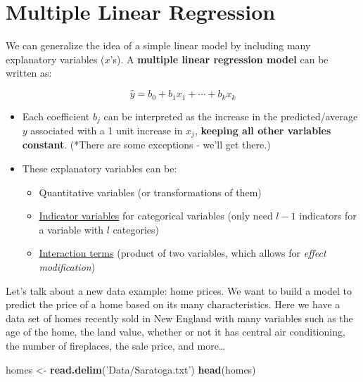 \documentclass[]{book}
\newenvironment{Shaded}{\begin{snugshade}}{\end{snugshade}}
\newcommand{\KeywordTok}[1]{\textcolor[rgb]{0.13,0.29,0.53}{\textbf{#1}}}
\newcommand{\NormalTok}[1]{#1}
\newcommand{\StringTok}[1]{\textcolor[rgb]{0.31,0.60,0.02}{#1}}
\providecommand{\tightlist}{%
  \setlength{\itemsep}{0pt}\setlength{\parskip}{0pt}}
\begin{document}
\hypertarget{multiple-linear-regression}{%
\section{Multiple Linear Regression}\label{multiple-linear-regression}}

We can generalize the idea of a simple linear model by including many explanatory variables (\(x\)'s). A \textbf{multiple linear regression model} can be written as:

\[\hat{y} = b_0 + b_1x_{1} + \cdots + b_kx_{k}\]

\begin{itemize}
\item
  Each coefficient \(b_j\) can be interpreted as the increase in the predicted/average \(y\) associated with a 1 unit increase in \(x_j\), \textbf{keeping all other variables constant}. (*There are some exceptions - we'll get there.)
\item
  These explanatory variables can be:

  \begin{itemize}
  \tightlist
  \item
    Quantitative variables (or transformations of them)
  \item
    \protect\hyperlink{indicator-variables}{Indicator variables} for categorical variables (only need \(l-1\) indicators for a variable with \(l\) categories)
  \item
    \protect\hyperlink{interaction-variables}{Interaction terms} (product of two variables, which allows for \emph{effect modification})
  \end{itemize}
\end{itemize}

Let's talk about a new data example: home prices. We want to build a model to predict the price of a home based on its many characteristics. Here we have a data set of homes recently sold in New England with many variables such as the age of the home, the land value, whether or not it has central air conditioning, the number of fireplaces, the sale price, and more\ldots{}

\begin{Shaded}
\begin{Highlighting}[]
\NormalTok{homes <-}\StringTok{ }\KeywordTok{read.delim}\NormalTok{(}\StringTok{'Data/Saratoga.txt'}\NormalTok{)}
\KeywordTok{head}\NormalTok{(homes)}
\end{Highlighting}
\end{Shaded}
\end{document}
